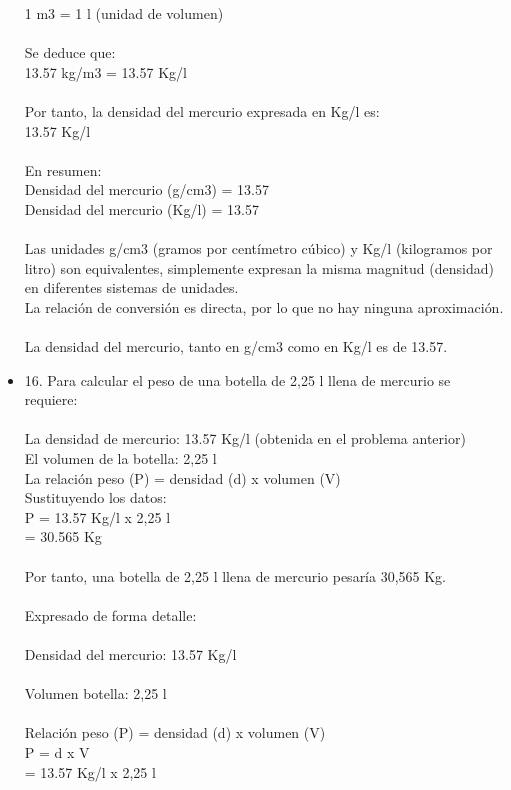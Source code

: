 \documentclass{article}
\begin{document}
\begin{itemize}
1 m3 = 1 l (unidad de volumen)\\
\\
Se deduce que:\\
13.57 kg/m3 = 13.57 Kg/l\\
\\
Por tanto, la densidad del mercurio expresada en Kg/l es:\\
13.57 Kg/l\\
\\
En resumen:\\
Densidad del mercurio (g/cm3) = 13.57\\
Densidad del mercurio (Kg/l) = 13.57\\
\\
Las unidades g/cm3 (gramos por centímetro cúbico) y Kg/l (kilogramos por litro) son equivalentes, simplemente expresan la misma magnitud (densidad) en diferentes sistemas de unidades.\\
La relación de conversión es directa, por lo que no hay ninguna aproximación.\\
\\
La densidad del mercurio, tanto en g/cm3 como en Kg/l es de 13.57.\\
\item{16.}
Para calcular el peso de una botella de 2,25 l llena de mercurio se requiere:\\
\\
La densidad de mercurio: 13.57 Kg/l (obtenida en el problema anterior)\\
El volumen de la botella: 2,25 l\\
La relación peso (P) = densidad (d) x volumen (V)\\
Sustituyendo los datos:\\
P = 13.57 Kg/l x 2,25 l\\
= 30.565 Kg\\
\\
Por tanto, una botella de 2,25 l llena de mercurio pesaría 30,565 Kg.\\
\\
Expresado de forma detalle:\\
\\
Densidad del mercurio: 13.57 Kg/l\\
\\
Volumen botella: 2,25 l\\
\\
Relación peso (P) = densidad (d) x volumen (V)\\
P = d x V\\
= 13.57 Kg/l x 2,25 l\\

\end{itemize}
\end{document}
